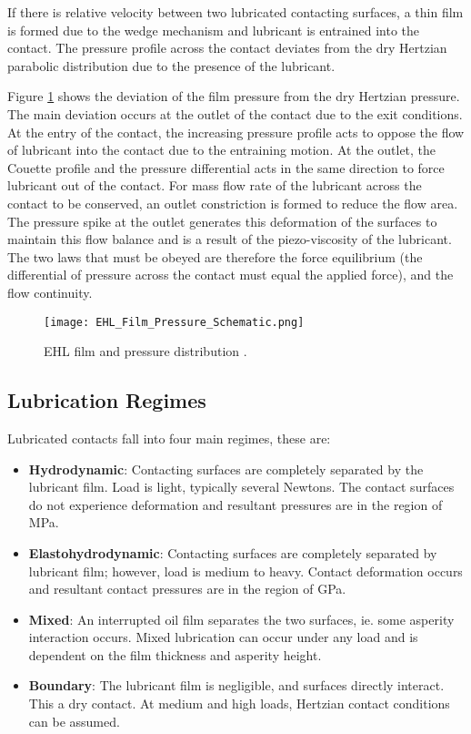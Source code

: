 If there is relative velocity between two lubricated contacting surfaces, a thin film is formed due to the wedge mechanism and lubricant is entrained into the contact. The pressure profile across the contact deviates from the dry Hertzian parabolic distribution due to the presence of the lubricant.

Figure \ref{EHL_Film_Pressure_Schematic} shows the deviation of the film pressure from the dry Hertzian pressure. The main deviation occurs at the outlet of the contact due to the exit conditions. At the entry of the contact, the increasing pressure profile acts to oppose the flow of lubricant into the contact due to the entraining motion. At the outlet, the Couette profile and the pressure differential acts in the same direction to force lubricant out of the contact. For mass flow rate of the lubricant across the contact to be conserved, an outlet constriction is formed to reduce the flow area. The pressure spike at the outlet generates this deformation of the surfaces to maintain this flow balance and is a result of the piezo-viscosity of the lubricant. The two laws that must be obeyed are therefore the force equilibrium (the differential of pressure across the contact must equal the applied force), and the flow continuity.

\begin{figure}
	\centerline{\texttt{[image: EHL\_Film\_Pressure\_Schematic.png]}}
	\caption{EHL film and pressure distribution \cite{Larsson2013}.}
	\label{EHL_Film_Pressure_Schematic}
\end{figure}

\subsection{Lubrication Regimes}

Lubricated contacts fall into four main regimes, these are:

\begin{itemize}
	\item \textbf{Hydrodynamic}: Contacting surfaces are completely separated by the lubricant film. Load is light, typically several Newtons. The contact surfaces do not experience deformation and resultant pressures are in the region of MPa.
	\item \textbf{Elastohydrodynamic}: Contacting surfaces are completely separated by lubricant film; however, load is medium to heavy. Contact deformation occurs and resultant contact pressures are in the region of GPa.
	\item \textbf{Mixed}: An interrupted oil film separates the two surfaces, ie. some asperity interaction occurs. Mixed lubrication can occur under any load and is dependent on the film thickness and asperity height.
	\item \textbf{Boundary}: The lubricant film is negligible, and surfaces directly interact. This a dry contact. At medium and high loads, Hertzian contact conditions can be assumed.
\end{itemize}

